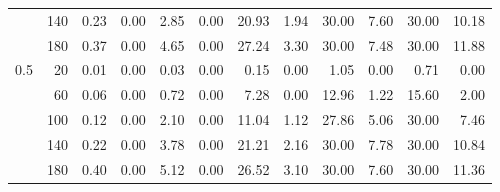 \begin{table}[h!]
{\begin{tabular}{@{}lrrrrrrrrrrr@{}}
                               & 140                             & 0.23                         & 0.00                         & 2.85                        & 0.00                         & 20.93                       & 1.94                         & 30.00                       & 7.60                         & 30.00                       & 10.18                        \\
                               & 180                             & 0.37                         & 0.00                         & 4.65                        & 0.00                         & 27.24                       & 3.30                         & 30.00                       & 7.48                         & 30.00                       & 11.88                        \\ \midrule
\multicolumn{1}{r}{0.5}        & 20                              & 0.01                          & 0.00                         & 0.03                          & 0.00                        & 0.15                                                      & 0.00                         & 1.05                         & 0.00                         & 0.71                         & 0.00                         \\
                               & 60                              & 0.06                          & 0.00                        & 0.72                         & 0.00                         & 7.28                       & 0.00                         & 12.96                       & 1.22                         & 15.60                       & 2.00                        \\
                               & 100                             & 0.12                          & 0.00                         & 2.10                        & 0.00                         & 11.04                       & 1.12                         & 27.86                       & 5.06                         & 30.00                       & 7.46                         \\
                               & 140                             & 0.22                         & 0.00                         & 3.78                        & 0.00                         & 21.21                     & 2.16                         & 30.00                       & 7.78                        & 30.00                       & 10.84                       \\
                               & 180                             & 0.40                        & 0.00                         & 5.12                        & 0.00                         & 26.52                     & 3.10                         & 30.00                       & 7.60                         & 30.00                       & 11.36                        \\ \midrule

\end{tabular}}
\end{table}
